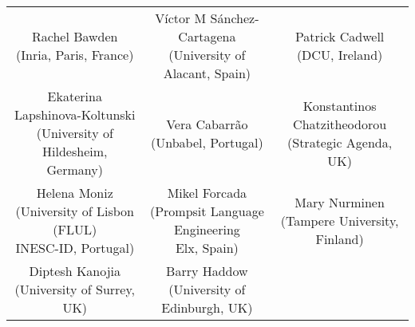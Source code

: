 \begin{center}
\begin{tabular}{ c c c}
	\makecell{Rachel Bawden \\ (Inria, Paris, France) \\ \vspace{0.5cm}} & \makecell{Víctor M Sánchez-Cartagena \\ (University of Alacant, Spain) \\ \vspace{0.5cm}} & \makecell{Patrick Cadwell \\ (DCU, Ireland) \\ \vspace{0.5cm}} \\ 
	\makecell{Ekaterina Lapshinova-Koltunski \\ (University of Hildesheim, Germany)\\ \vspace{0.5cm}} & \makecell{Vera Cabarrão \\ (Unbabel, Portugal)\\ \vspace{0.5cm}} & \makecell{Konstantinos Chatzitheodorou \\ (Strategic Agenda, UK)\\ \vspace{0.5cm}} \\
	\makecell{Helena Moniz \\ (University of Lisbon (FLUL) \\ INESC-ID, Portugal)\\ \vspace{0.5cm}} & \makecell{Mikel Forcada \\ (Prompsit Language Engineering \\ Elx, Spain)\\ \vspace{0.5cm}} & \makecell{Mary Nurminen \\ (Tampere University, Finland)\\ \vspace{0.5cm}} \\
	\makecell{Diptesh Kanojia \\ (University of Surrey, UK)} & \makecell{Barry Haddow \\ (University of Edinburgh, UK)} &  \\

\end{tabular}
\end{center}



